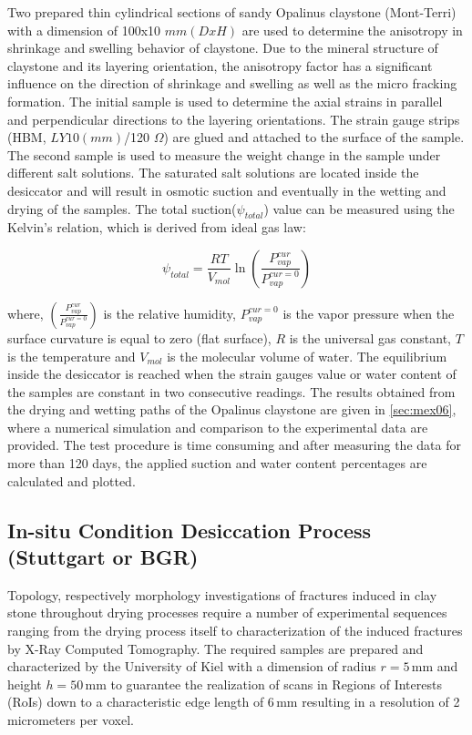 Two prepared thin cylindrical sections of sandy Opalinus claystone (Mont-Terri) with a dimension of 100x10 $mm (DxH)$ are used to determine the anisotropy in shrinkage and swelling behavior of claystone. Due to the mineral structure of claystone and its layering orientation, the anisotropy factor has a significant influence on the direction of shrinkage and swelling as well as the micro fracking formation. The initial sample is used to determine the axial strains in parallel and perpendicular directions to the layering orientations. The strain gauge strips (HBM, $LY 10 (mm)$/120 $\Omega$) are glued and attached to the surface of the sample. The second sample is used to measure the weight change in the sample under different salt solutions. The saturated salt solutions are located inside the desiccator and will result in osmotic suction and eventually in the wetting and drying of the samples. The total suction($\psi_{total}$) value can be measured using the Kelvin’s relation, which is derived from ideal gas law:

\begin{equation}
\label{eq:Total_Suction}
\psi_{total} = \frac{RT}{V_{mol}} \ln(\frac{P_{vap}^{cur}}{P_{vap}^{cur=0}})
\end{equation}

where, $(\frac{P_{vap}^{cur}}{P_{vap}^{cur=0}})$ is the relative humidity, $P_{vap}^{cur=0}$ is the vapor pressure when the surface curvature is equal to zero (flat surface), $R$ is the universal gas constant, $T$ is the temperature and $V_{mol}$ is the molecular volume of water. The equilibrium inside the desiccator is reached when the strain gauges value or water content of the samples are constant in two consecutive readings. The results obtained from the drying and wetting paths of the Opalinus claystone are given in \ref{sec:mex06}, where a numerical simulation and comparison to the experimental data are provided. The test procedure is time consuming and after measuring the data for more than 120 days, the applied suction and water content percentages are calculated and plotted. 

\subsection{In-situ Condition Desiccation Process (Stuttgart or BGR)}
Topology, respectively morphology investigations of fractures induced in clay stone throughout drying processes require a number of experimental sequences ranging from the drying process itself to characterization of the induced fractures by X-Ray Computed Tomography. The required samples are prepared and characterized by the University of Kiel with a dimension of radius $r = 5 \, \text{mm}$ and height $h = 50 \, \text{mm}$ to guarantee the realization of scans in Regions of Interests (RoIs) down to a characteristic edge length of $6 \, \text{mm}$ resulting in a resolution of 2 micrometers per voxel.

